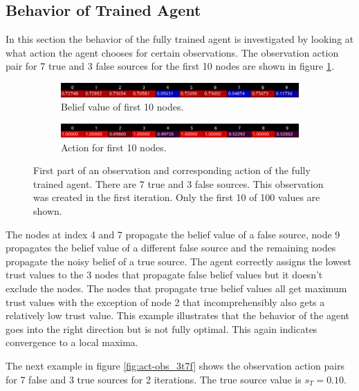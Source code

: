 \documentclass[11pt, a4paper]{article}
\begin{document}
\subsection{Behavior of Trained Agent} \label{sec:res_behavior}
In this section the behavior of the fully trained agent is investigated by looking at what action the agent chooses for certain observations. The observation action pair for 7 true and 3 false sources for the first 10 nodes are shown in figure \ref{fig:act-obs_7t3f}.

\begin{figure}[h]
	\begin{subfigure}{\textwidth}
		\centering
		\includegraphics[width=.85\linewidth]{7t3f_obs_iter1_hc.png}  
		\caption{Belief value of first 10 nodes.}
	\end{subfigure}
	\begin{subfigure}{\textwidth}
		\centering
		\includegraphics[width=.85\linewidth]{7t3f_action_iter1_hc.png}  
		\caption{Action for first 10 nodes.}
	\end{subfigure}
	\caption{\label{fig:act-obs_7t3f}First part of an observation and corresponding action of the fully trained agent. There are 7 true and 3 false sources. This observation was created in the first iteration. Only the first 10 of 100 values are shown.}
\end{figure}

The nodes at index 4 and 7 propagate the belief value of a false source, node 9 propagates the belief value of a different false source and the remaining nodes propagate the noisy belief of a true source. The agent correctly assigns the lowest trust values to the 3 nodes that propagate false belief values but it doesn't exclude the nodes. The nodes that propagate true belief values all get maximum trust values with the exception of node 2 that incomprehensibly also gets a relatively low trust value. This example illustrates that the behavior of the agent goes into the right direction but is not fully optimal. This again indicates convergence to a local maxima. \newline

The next example in figure \ref{fig:act-obs_3t7f} shows the observation action pairs for 7 false and 3 true sources for 2 iterations. The true source value is $s_T = 0.10$.
\end{document}
